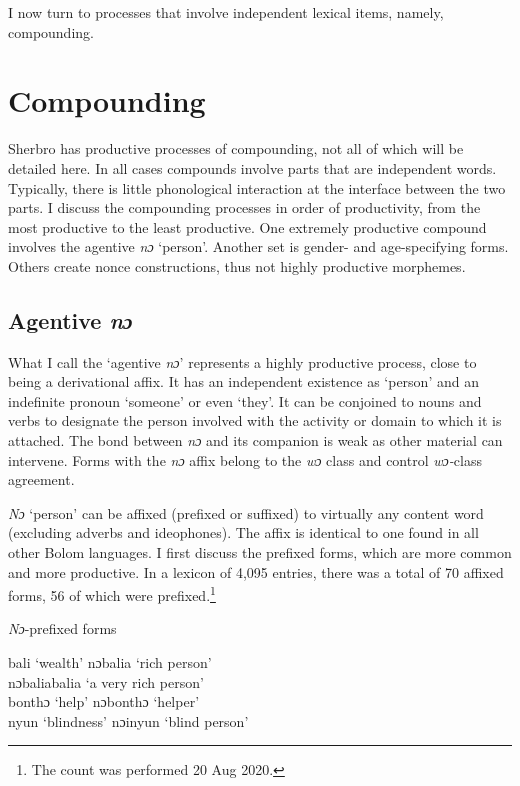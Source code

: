 I now turn to processes that involve independent lexical items, namely, compounding.

\section{Compounding}
\label{sec:7.3}\hypertarget{Toc115517807}{}
Sherbro has productive processes of compounding, not all of which will be detailed here. In all cases compounds involve parts that are independent words. Typically, there is little phonological interaction at the interface between the two parts. I discuss the compounding processes in order of productivity, from the most productive to the least productive. One extremely productive compound involves the agentive \textit{nɔ} ‘person'. Another set is gender- and age-specifying forms. Others create nonce constructions, thus not highly productive morphemes.

\subsection{Agentive \textit{nɔ}}
\label{sec:7.3.1}\hypertarget{Toc115517808}{}
What I call the ‘agentive \textit{nɔ}' represents a highly productive process, close to being a derivational affix. It has an independent existence as ‘person' and an indefinite pronoun ‘someone' or even ‘they'. It can be conjoined to nouns and verbs to designate the person involved with the activity or domain to which it is attached. The bond between \textit{nɔ} and its companion is weak as other material can intervene. Forms with the \textit{nɔ} affix belong to the \textit{wɔ} class and control \textit{wɔ-}class agreement.

\textit{Nɔ} ‘person' can be affixed (prefixed or suffixed) to virtually any content word (excluding adverbs and ideophones). The affix is identical to one found in all other Bolom languages. I first discuss the prefixed forms, which are more common and more productive. In a lexicon of 4,095 entries, there was a total of 70 affixed forms, 56 of which were prefixed.\footnote{The count was performed 20 {Aug 2020}.}

\TabPositions{1.25cm,3.5cm,6.5cm,8cm}
\ea%
    \label{ex:175} \textit{Nɔ}{}-prefixed forms\\
    \vspace{6pt}
    
    bali \tab  ‘wealth' \tab nɔbalia \tab  ‘rich person'\\
\tab\tab nɔbaliabalia \tab  ‘a very rich person'\\
    bonthɔ \tab ‘help' \tab nɔbonthɔ \tab  ‘helper'\\
    nyun \tab  ‘blindness' \tab nɔinyun \tab  ‘blind person'\\
\z

